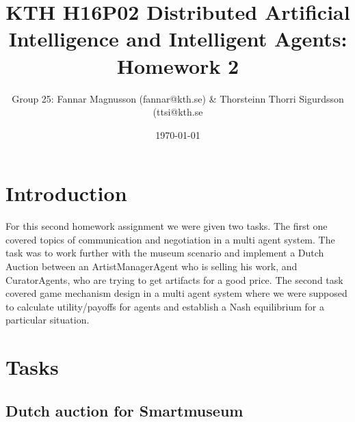 \documentclass[a4paper, 11pt]{article}
\title{KTH H16P02 Distributed Artificial Intelligence and Intelligent Agents: Homework 2}
\author{Group 25: Fannar Magnusson (fannar@kth.se) & Thorsteinn Thorri Sigurdsson (ttsi@kth.se}
\date{\today{}}
\begin{document}
\maketitle

\section{Introduction}

For this second homework assignment we were given two tasks. The first one covered topics of communication and negotiation in a multi agent system. The task was to work further with the museum scenario and implement a Dutch Auction between an ArtistManagerAgent who is selling his work, and CuratorAgents, who are trying to get artifacts for a good price. The second task covered game mechanism design in a multi agent system where we were supposed to calculate utility/payoffs for agents and establish a Nash equilibrium for a particular situation.

\section{Tasks}

\subsection{Dutch auction for Smartmuseum}
\end{document}
